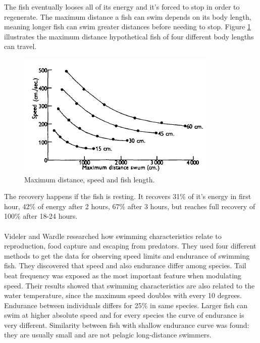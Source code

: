 \documentclass[internal]{FRIreport}
\begin{document}
The fish eventually looses all of its energy and it's forced to stop in order to regenerate. The maximum distance a fish can swim depends on its body length, meaning longer fish can swim greater distances before needing to stop. Figure \ref{ref:slika2} illustrates the maximum distance hypothetical fish of four different body lengths can travel.
\begin{figure}[H]
\centering
\includegraphics[scale=0.9]{2.png}
\caption{Maximum distance, speed and fish length.}
\label{ref:slika2}
\end{figure} \hfill \break
The recovery happens if the fish is resting. It recovers 31\% of it's energy in first hour, 42\% of energy after 2 hours, 67\% after 3 hours, but reaches full recovery of 100\% after 18-24 hours.
~\\\\
Videler and Wardle \cite{videler1991fish} researched how swimming characteristics relate to reproduction, food capture and escaping from predators. They used four different methods to get the data for observing speed limits and endurance of swimming fish. They discovered that speed and also endurance differ among species. Tail beat frequency was exposed as the most important feature when modulating speed. Their results showed that swimming characteristics are also related to the water temperature, since the maximum speed doubles with every 10 degrees. Endurance between individuals differs for 25\% in same species. Larger fish can swim at higher absolute speed and for every species the curve of endurance is very different. Similarity between fish with shallow endurance curve was found: they are usually small and are not pelagic long-distance swimmers.
~\\
\end{document}
